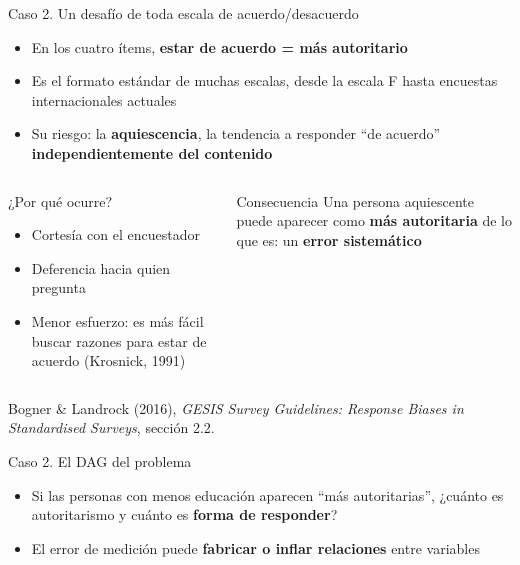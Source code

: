 \documentclass[aspectratio=169,11pt]{beamer}
\newcommand{\hl}[1]{\textcolor{marino}{\textbf{#1}}}        %
\newcommand{\hlr}[1]{\textcolor{acero}{\textbf{#1}}}        %
\newcommand{\fuente}[1]{\par\vfill{\scriptsize\color{gris}#1\par}}
\begin{document}
\begin{frame}{Caso 2. Un desafío de toda escala de acuerdo/desacuerdo}
\begin{itemize}
  \item En los cuatro ítems, \textbf{estar de acuerdo = más autoritario}
  \item Es el formato estándar de muchas escalas, desde la escala F hasta encuestas internacionales actuales
  \item Su riesgo: la \hl{aquiescencia}, la tendencia a responder ``de acuerdo'' \textbf{independientemente del contenido}
\end{itemize}
\bigskip
\begin{columns}[T]
\begin{block}{¿Por qué ocurre?}
\small
\begin{itemize}
  \item Cortesía con el encuestador
  \item Deferencia hacia quien pregunta
  \item Menor esfuerzo: es más fácil buscar razones para estar de acuerdo (Krosnick, 1991)
\end{itemize}
\end{block}
\begin{alertblock}{Consecuencia}
\small
Una persona aquiescente puede aparecer como \textbf{más autoritaria} de lo que es: un \hlr{error sistemático}
\end{alertblock}
\end{columns}
\fuente{Bogner \& Landrock (2016), \emph{GESIS Survey Guidelines: Response Biases in Standardised Surveys}, sección 2.2.}
\end{frame}

\begin{frame}{Caso 2. El DAG del problema}
\centering
{}
\bigskip
\begin{itemize}
  \item Si las personas con menos educación aparecen ``más autoritarias'', ¿cuánto es autoritarismo y cuánto es \textbf{forma de responder}?
  \item El error de medición puede \hl{fabricar o inflar relaciones} entre variables
\end{itemize}
\end{frame}
\end{document}

